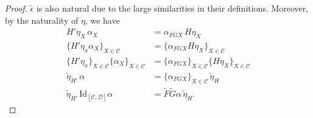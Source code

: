 \documentclass[ 12pt ]{article}
\begin{document}
\begin{enumerate}
\begin{proof}
$\widetilde{\epsilon}$ is also natural due to the large similarities in their definitions. Moreover, by the naturality of $\eta$, we have
			\begin{align*}
				H' \eta_X\, \alpha_X &= \alpha_{FGX}\, H \eta_X \\
				\{ H' \eta_x \alpha_X \}_{X \in \mathscr{C}} &= \{ \alpha_{FGX} H \eta_X \}_{X \in \mathscr{C}} \\
				\{ H' \eta_x \}_{X \in \mathscr{C}} \{ \alpha_X \}_{X \in \mathscr{C}} &= \{ \alpha_{FGX} \}_{X \in \mathscr{C}} \{ H \eta_X \}_{X \in \mathscr{C}} \\
				\widetilde{\eta}_{H'}\, \alpha &= \{ \alpha_{FGX} \}_{X \in \mathscr{C}}\, \widetilde{\eta}_H \\
				\widetilde{\eta}_{H'}\, \mathrm{Id}_{[\mathscr{C}, \mathscr{D}]} \alpha &= \widetilde{F} \widetilde{G} \alpha\, \widetilde{\eta}_H.
			\end{align*}
		\end{proof}

\end{enumerate}
\end{document}
